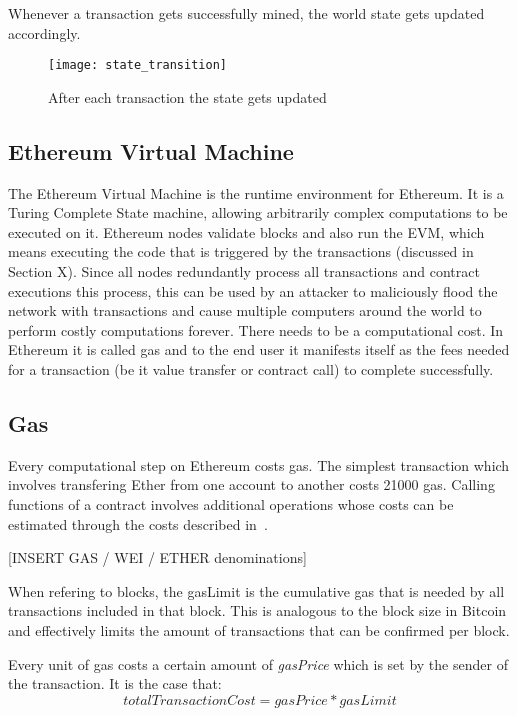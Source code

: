 Whenever a transaction gets successfully mined, the world state gets updated accordingly.

\begin{figure}[ht]
    \centering
    \texttt{[image: state\_transition]}
    \caption{After each transaction the state gets updated}
    \label{blockchain}
\end{figure}

\subsection{Ethereum Virtual Machine}
The Ethereum Virtual Machine is the runtime environment for Ethereum. It is a Turing Complete State machine, allowing arbitrarily complex computations to be executed on it. Ethereum nodes validate blocks and also run the EVM, which means executing the code that is triggered by the transactions (discussed in Section X). Since all nodes redundantly process all transactions and contract executions this process, this can be used by an attacker to maliciously flood the network with transactions and cause multiple computers around the world to perform costly computations forever. There needs to be a computational cost. In Ethereum it is called gas and to the end user it manifests itself as the fees needed for a transaction (be it value transfer or contract call) to complete successfully.

\subsection{Gas}
Every computational step on Ethereum costs gas. The simplest transaction which involves transfering Ether from one account to another costs 21000 gas. Calling functions of a contract involves additional operations whose costs can be estimated through the costs described in~\cite{gas, ethereum}. 

[INSERT GAS / WEI / ETHER denominations]

When refering to blocks, the gasLimit is the cumulative gas that is needed by all transactions included in that block. This is analogous to the block size in Bitcoin and effectively limits the amount of transactions that can be confirmed per block.

Every unit of gas costs a certain amount of \textit{gasPrice} which is set by the sender of the transaction. 
It is the case that:
\begin{equation}
    totalTransactionCost = gasPrice * gasLimit
\end{equation}

